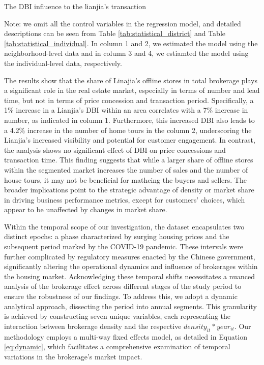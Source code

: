 \documentclass[11pt]{article}
\begin{document}
\begin{table}[htb!]
    \centering
    \begin{scriptsize}
    
    \caption{The DBI influence to the lianjia's transaction}

    Note: we omit all the control variables in the regression model, and detailed descriptions can be seen from Table \ref{tab:statistical_district} and Table \ref{tab:statistical_individual}. In column 1 and 2, we estimated the model using the neighborhood-level data and in column 3 and 4, we estiamted the model using the individual-level data, respectively. 
    \label{tab:stylized_fact}
    \end{scriptsize}
\end{table}

The results show that the share of Linajia's offline stores in total brokerage plays a significant role in the real estate market, especially in terms of number and lead time, but not in terms of price concession and transaction period. Specifically, a 1\% increase in a Lianjia's DBI within an area correlates with a 7\% increase in number, as indicated in column 1. Furthermore, this increased DBI also leads to a 4.2\% increase in the number of home tours in the column 2, underscoring the Lianjia's increased visibility and potential for customer engagement. In contrast, the analysis shows no significant effect of DBI on price concessions and transaction time. This finding suggests that while a larger share of offline stores within the segmented market increases the number of sales and the number of house tours, it may not be beneficial for mathcing the buyers and sellers. The broader implications point to the strategic advantage of density or market share in driving business performance metrics, except for customers' choices, which appear to be unaffected by changes in market share.

Within the temporal scope of our investigation, the dataset encapsulates two distinct epochs: a phase characterized by surging housing prices and the subsequent period marked by the COVID-19 pandemic. These intervals were further complicated by regulatory measures enacted by the Chinese government, significantly altering the operational dynamics and influence of brokerages within the housing market. Acknowledging these temporal shifts necessitates a nuanced analysis of the brokerage effect across different stages of the study period to ensure the robustness of our findings. To address this, we adopt a dynamic analytical approach, dissecting the period into annual segments. This granularity is achieved by constructing seven unique variables, each representing the interaction between brokerage density and the respective $density_{it} * year_{it}$. Our methodology employs a multi-way fixed effects model, as detailed in Equation \eqref{eq:dynamic}, which facilitates a comprehensive examination of temporal variations in the brokerage's market impact.
\end{document}
